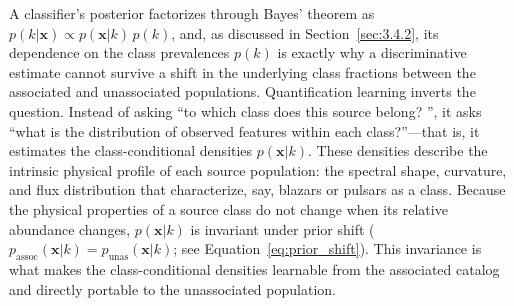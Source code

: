 A classifier's posterior factorizes through Bayes' theorem as $p(k|\mathbf{x}) \propto p(\mathbf{x}|k)\,p(k)$, and, as discussed in Section~\ref{sec:3.4.2}, its dependence on the class prevalences $p(k)$ is exactly why a discriminative estimate cannot survive a shift in the underlying class fractions between the associated and unassociated populations.
Quantification learning inverts the question.
Instead of asking ``to which class does this source belong?
'', it asks ``what is the distribution of observed features within each class?''---that is, it estimates the class-conditional densities $p(\mathbf{x}|k)$.
These densities describe the intrinsic physical profile of each source population: the spectral shape, curvature, and flux distribution that characterize, say, blazars or pulsars as a class.
Because the physical properties of a source class do not change when its relative abundance changes, $p(\mathbf{x}|k)$ is invariant under prior shift ($p_\mathrm{assoc}(\mathbf{x}|k) = p_\mathrm{unas}(\mathbf{x}|k)$; see Equation~\ref{eq:prior_shift}).
This invariance is what makes the class-conditional densities learnable from the associated catalog and directly portable to the unassociated population.

